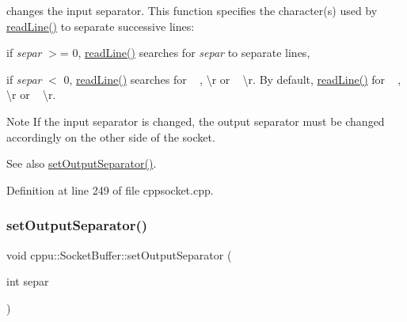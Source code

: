changes the input separator. This function specifies the character(s) used by \mbox{\hyperlink{classcppu_1_1_socket_buffer_a222769d3776b9cbd3a727ee1f0e60358}{read\+Line()}} to separate successive lines\+: 


\begin{DoxyItemize}
\item if {\itshape separ} $>$= 0, \mbox{\hyperlink{classcppu_1_1_socket_buffer_a222769d3776b9cbd3a727ee1f0e60358}{read\+Line()}} searches for {\itshape separ} to separate lines,
\item if {\itshape separ} $<$ 0, \mbox{\hyperlink{classcppu_1_1_socket_buffer_a222769d3776b9cbd3a727ee1f0e60358}{read\+Line()}} searches for ~\newline
, \textbackslash{}r or ~\newline
\textbackslash{}r. By default, \mbox{\hyperlink{classcppu_1_1_socket_buffer_a222769d3776b9cbd3a727ee1f0e60358}{read\+Line()}} for ~\newline
, \textbackslash{}r or ~\newline
\textbackslash{}r. \begin{DoxyNote}{Note}
If the input separator is changed, the output separator must be changed accordingly on the other side of the socket. 
\end{DoxyNote}
\begin{DoxySeeAlso}{See also}
\mbox{\hyperlink{classcppu_1_1_socket_buffer_a0e5e6a9ce3bda28b65c559c8b3c91b0f}{set\+Output\+Separator()}}. 
\end{DoxySeeAlso}

\end{DoxyItemize}

Definition at line 249 of file cppsocket.\+cpp.


\begin{DoxyCode}{0}

\end{DoxyCode}
\mbox{\label{classcppu_1_1_socket_buffer_a0e5e6a9ce3bda28b65c559c8b3c91b0f}} 
\subsubsection{\texorpdfstring{setOutputSeparator()}{setOutputSeparator()}}
{\footnotesize\ttfamily void cppu\+::\+Socket\+Buffer\+::set\+Output\+Separator (\begin{DoxyParamCaption}\item[{int}]{separ }\end{DoxyParamCaption})\hspace{0.3cm}{\ttfamily [virtual]}}



